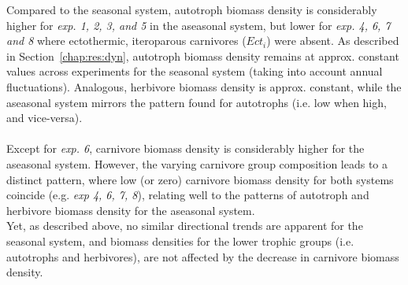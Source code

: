Compared to the seasonal system, autotroph biomass density is considerably higher for \textit{exp. 1, 2, 3, and 5} in the aseasonal system, but lower for \textit{exp. 4, 6, 7 and 8} where ectothermic, iteroparous carnivores ($Ect_i$) were absent. As described in Section~\ref{chap:res:dyn}, autotroph biomass density remains at approx. constant values across experiments for the seasonal system (taking into account annual fluctuations). 
Analogous, herbivore biomass density is approx. constant, while the aseasonal system mirrors the pattern found for autotrophs (i.e. low when high, and vice-versa). \\\\
Except for \textit{exp. 6}, carnivore biomass density is considerably higher for the aseasonal system. 
However, the varying carnivore group composition leads to a distinct pattern, where low (or zero) carnivore biomass density for both systems coincide (e.g. \textit{exp 4, 6, 7, 8}), relating well to the patterns of autotroph and herbivore biomass density for the aseasonal system. \\
Yet, as described above, no similar directional trends are apparent for the seasonal system, and biomass densities for the lower trophic groups (i.e. autotrophs and herbivores), are not affected by the decrease in carnivore biomass density. 

